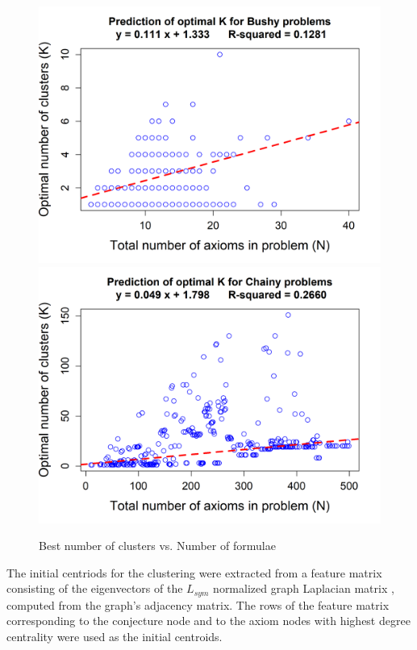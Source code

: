 \documentclass[EPiC]{easychair}
\begin{document}
\begin{figure}[H]
\centering
\includegraphics[scale=0.42]{median-regression-optimal-k-bushy.png}
\includegraphics[scale=0.42]{median-regression-optimal-k-chainy.png}
\vspace{1mm}
\caption{Best number of clusters vs. Number of formulae}
\label{fig:median-regression}
\end{figure}

The initial centriods for the clustering were extracted from a feature matrix 
consisting of the eigenvectors of the $L_{sym}$ normalized graph Laplacian 
matrix \cite{vLu07}, computed from the graph's adjacency matrix.
The rows of the feature matrix corresponding to the conjecture node and to 
the axiom nodes with highest degree centrality were used as the initial 
centroids.
\end{document}
